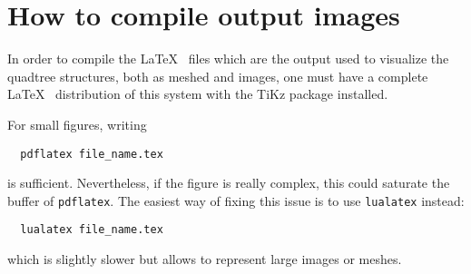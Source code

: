 \documentclass[a4paper,10pt]{article}
\begin{document}
\section{How to compile output images}
In order to compile the \LaTeX ~ files which are the output used to visualize the quadtree structures, both as meshed and images, one must have a complete \LaTeX ~ distribution of this system with the TiKz package installed.

For small figures, writing
\begin{center}
 \begin{verbatim}
  pdflatex file_name.tex
 \end{verbatim}
\end{center}
is sufficient. Nevertheless, if the figure is really complex, this could saturate the buffer of \texttt{pdflatex}. The easiest way of fixing this issue is to use \texttt{lualatex} instead:
\begin{center}
 \begin{verbatim}
  lualatex file_name.tex
 \end{verbatim}
\end{center}
which is slightly slower but allows to represent large images or meshes.
\end{document}
